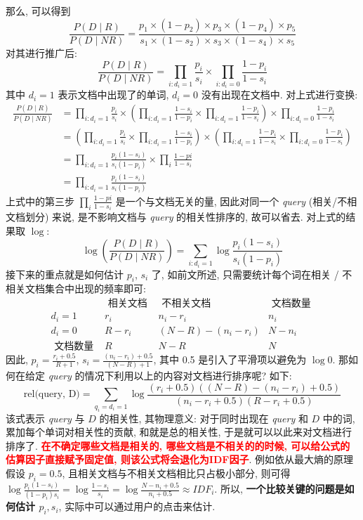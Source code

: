 那么, 可以得到
$$
\frac{P(D \mid R)}{P(D \mid N R)}=\frac{p_{1} \times\left(1-p_{2}\right) \times p_{3} \times\left(1-p_{4}\right) \times p_{5}}{s_{1} \times\left(1-s_{2}\right) \times s_{3} \times\left(1-s_{4}\right) \times s_{5}}
$$
对其进行推广后:
$$
\frac{P(D \mid R)}{P(D \mid N R)}=\prod_{i: d_{i}=1} \frac{p_{i}}{s_{i}} \times \prod_{i: d_{i}=0} \frac{1-p_{i}}{1-s_{i}}
$$
其中 $d_i=1$ 表示文档中出现了的单词, $d_i=0$ 没有出现在文档中. 对上式进行变换:
$$
\begin{aligned}
	\frac{P(D \mid R)}{P(D \mid N R)} &=\prod_{i: d_{i}=1} \frac{p_{i}}{s_{i}} \times\left(\prod_{i: d_{i}=1} \frac{1-s_{i}}{1-p_{i}} \times \prod_{i: d_{i}=1} \frac{1-p_{i}}{1-s_{i}}\right) \times \prod_{i: d_{i}=0} \frac{1-p_{i}}{1-s_{i}} \\
	&=\left(\prod_{i: d_{i}=1} \frac{p_{i}}{s_{i}} \times \prod_{i: d_{i}=1} \frac{1-s_{i}}{1-p_{i}}\right) \times\left(\prod_{i: d_{i}=1} \frac{1-p_{i}}{1-s_{i}} \times \prod_{i: d_{i}=0} \frac{1-p_{i}}{1-s_{i}}\right) \\
	&=\prod_{i: d_{i}=1} \frac{p_{i}\left(1-s_{i}\right)}{s_{i}\left(1-p_{i}\right)} \times \prod_{i} \frac{1-p i}{1-s_{i}} \\
	&=\prod_{i: d_{i}=1} \frac{p_{i}\left(1-s_{i}\right)}{s_{i}\left(1-p_{i}\right)}
\end{aligned}
$$
上式中的第三步 $\prod_{i} \frac{1-p i}{1-s_{i}}$ 是一个与文档无关的量, 因此对同一个 \textit{query} (相关/不相文档划分) 来说, 是不影响文档与 \textit{query} 的相关性排序的, 故可以省去. 对上式的结果取 $\log$:
$$
\log \left(\frac{P(D \mid R)}{P(D \mid N R)}\right)=\sum_{i: d_{i}=1} \log \frac{p_{i}\left(1-s_{i}\right)}{s_{i}\left(1-p_{i}\right)}
$$
接下来的重点就是如何估计 $p_i$, $s_i$ 了, 如前文所述, 只需要统计每个词在相关 / 不相关文档集合中出现的频率即可:
$$
\begin{array}{llll} 
	& \text { 相关文档 } & \text { 不相关文档 } & \text { 文档数量 } \\
	\hline d_{i}=1 & r_{i} & n_{i}-r_{i} & n_{i} \\
	d_{i}=0 & R-r_{i} & (N-R)-\left(n_{i}-r_{i}\right) & N-n_{i} \\
	\hline \text { 文档数量 } & R & N-R & N
\end{array}
$$
因此, $p_i = \frac{r_i + 0.5}{R+1}$, $s_i = \frac{(n_i - r_i) + 0.5 }{(N - R) + 1}$, 其中 0.5 是引入了平滑项以避免为 $\log 0$. 那如何在给定 \textit{query} 的情况下利用以上的内容对文档进行排序呢? 如下:
$$
\text{rel(query, D)} = \sum_{q_{i}=d_{i}=1} \log \frac{\left(r_{i}+0.5\right)\left((N-R)-\left(n_{i}-r_{i}\right)+0.5\right)}{\left(n_{i}-r_{i}+0.5\right)\left(R-r_{i}+0.5\right)}
$$
该式表示 \textit{query} 与 $D$ 的相关性, 其物理意义: 对于同时出现在 \textit{query} 和 $D$ 中的词, 累加每个单词对相关性的贡献, 和就是总的相关性, 于是就可以以此来对文档进行排序了. \textbf{\textcolor{red}{在不确定哪些文档是相关的, 哪些文档是不相关的的时候, 可以给公式的估算因子直接赋予固定值, 则该公式将会退化为IDF因子}}. 例如依从最大熵的原理假设 $p_i = 0.5$, 且相关文档与不相关文档相比只占极小部分, 则可得 $\log \frac{p_i (1 - s_i)}{(1 - p_i) s_i} = \log \frac{1 - s_i}{s_i} = \log \frac{N - n_i + 0.5}{n_i + 0.5} \approx IDF_i$. 所以, \textbf{一个比较关键的问题是如何估计 $p_i, s_i$}, 实际中可以通过用户的点击来估计.

